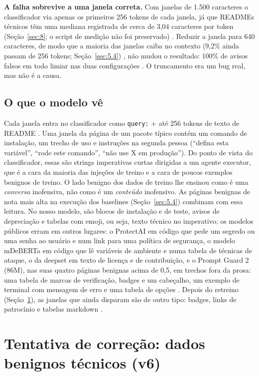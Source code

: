 \documentclass[11pt]{article}
\newcommand{\code}[1]{\texttt{#1}}
\begin{document}
\textbf{A falha sobrevive a uma janela correta.} Com janelas de 1.500 caracteres o classificador via apenas os primeiros 256 tokens de cada janela, já que READMEs técnicos têm uma mediana registrada de cerca de 3,04 caracteres por token (Seção~\ref{sec:8}; o script de medição não foi preservado)%
. Reduzir a janela para 640 caracteres, de modo que a maioria das janelas caiba no contexto (9,2\% ainda passam de 256 tokens; Seção~\ref{sec:5.4})%
, não mudou o resultado: 100\% de avisos falsos em todo limiar nas duas configurações%
. O truncamento era um bug real, mas não é a causa.

\subsection{O que o modelo vê}\label{sec:6.3}

Cada janela entra no classificador como \code{query:\textvisiblespace{}} + até 256 tokens de texto de README%
. Uma janela da página de um pacote típico contém um comando de instalação, um trecho de uso e instruções na segunda pessoa (``defina esta variável'', ``rode este comando'', ``não use X em produção''). Do ponto de vista do classificador, essas são strings imperativas curtas dirigidas a um agente executor, que é a cara da maioria das injeções de treino e a cara de poucos exemplos benignos de treino. O lado benigno dos dados de treino lhe ensinou como é uma \emph{conversa} inofensiva, não como é um \emph{conteúdo} inofensivo. As páginas benignas de nota mais alta na execução dos baselines (Seção~\ref{sec:5.4}) combinam com essa leitura. No nosso modelo, são blocos de instalação e de teste, avisos de depreciação e tabelas com emoji, ou seja, texto técnico no imperativo; os modelos públicos erram em outros lugares: o ProtectAI em código que pede um segredo ou uma senha ao usuário e num link para uma política de segurança, o modelo mDeBERTa em código que lê variáveis de ambiente e numa tabela de técnicas de ataque, o da deepset em texto de licença e de contribuição, e o Prompt Guard 2 (86M), nas suas quatro páginas benignas acima de 0,5, em trechos fora da prosa: uma tabela de marcas de verificação, badges e um cabeçalho, um exemplo de terminal com mensagem de erro e uma tabela de opções%
. Depois do retreino (Seção~\ref{sec:7}), as janelas que ainda disparam são de outro tipo: badges, links de patrocínio e tabelas markdown%
.

\section{Tentativa de correção: dados benignos técnicos (v6)}\label{sec:7}
\end{document}

